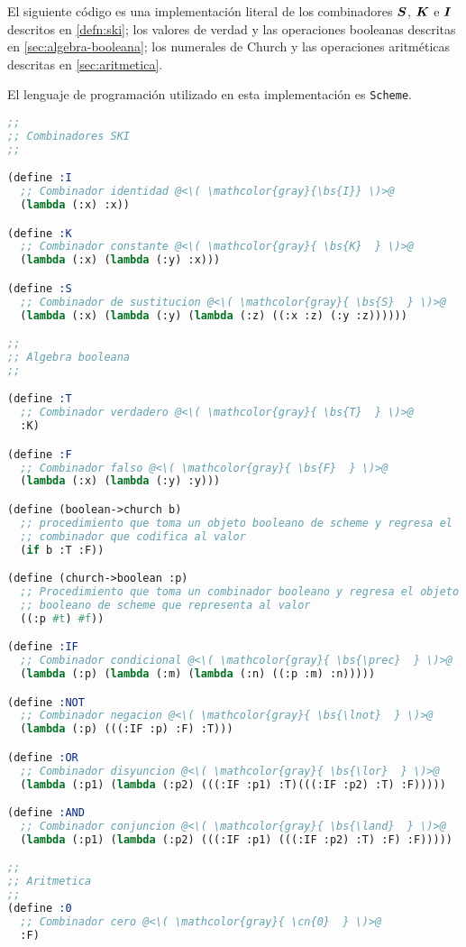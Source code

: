 El siguiente código es una implementación literal de los combinadores \( \boldsymbol{S} \), \( \boldsymbol{K} \) e \( \boldsymbol{I} \) descritos en \ref{defn:ski}; los valores de verdad y las operaciones booleanas descritas en \ref{sec:algebra-booleana}; los numerales de Church y las operaciones aritméticas descritas en \ref{sec:aritmetica}.

El lenguaje de programación utilizado en esta implementación es \texttt{Scheme}.

\begin{lstlisting}[language=scheme]
;; 
;; Combinadores SKI
;;

(define :I
  ;; Combinador identidad @<\( \mathcolor{gray}{\bs{I}} \)>@
  (lambda (:x) :x))

(define :K
  ;; Combinador constante @<\( \mathcolor{gray}{ \bs{K}  } \)>@
  (lambda (:x) (lambda (:y) :x)))

(define :S
  ;; Combinador de sustitucion @<\( \mathcolor{gray}{ \bs{S}  } \)>@
  (lambda (:x) (lambda (:y) (lambda (:z) ((:x :z) (:y :z))))))

;; 
;; Algebra booleana
;;

(define :T
  ;; Combinador verdadero @<\( \mathcolor{gray}{ \bs{T}  } \)>@
  :K)

(define :F
  ;; Combinador falso @<\( \mathcolor{gray}{ \bs{F}  } \)>@
  (lambda (:x) (lambda (:y) :y)))

(define (boolean->church b)
  ;; procedimiento que toma un objeto booleano de scheme y regresa el
  ;; combinador que codifica al valor
  (if b :T :F))

(define (church->boolean :p)
  ;; Procedimiento que toma un combinador booleano y regresa el objeto
  ;; booleano de scheme que representa al valor
  ((:p #t) #f))

(define :IF
  ;; Combinador condicional @<\( \mathcolor{gray}{ \bs{\prec}  } \)>@
  (lambda (:p) (lambda (:m) (lambda (:n) ((:p :m) :n)))))

(define :NOT
  ;; Combinador negacion @<\( \mathcolor{gray}{ \bs{\lnot}  } \)>@
  (lambda (:p) (((:IF :p) :F) :T)))

(define :OR
  ;; Combinador disyuncion @<\( \mathcolor{gray}{ \bs{\lor}  } \)>@
  (lambda (:p1) (lambda (:p2) (((:IF :p1) :T)(((:IF :p2) :T) :F)))))

(define :AND
  ;; Combinador conjuncion @<\( \mathcolor{gray}{ \bs{\land}  } \)>@
  (lambda (:p1) (lambda (:p2) (((:IF :p1) (((:IF :p2) :T) :F) :F)))))

;; 
;; Aritmetica
;; 
(define :0
  ;; Combinador cero @<\( \mathcolor{gray}{ \cn{0}  } \)>@
  :F)


\end{lstlisting}
